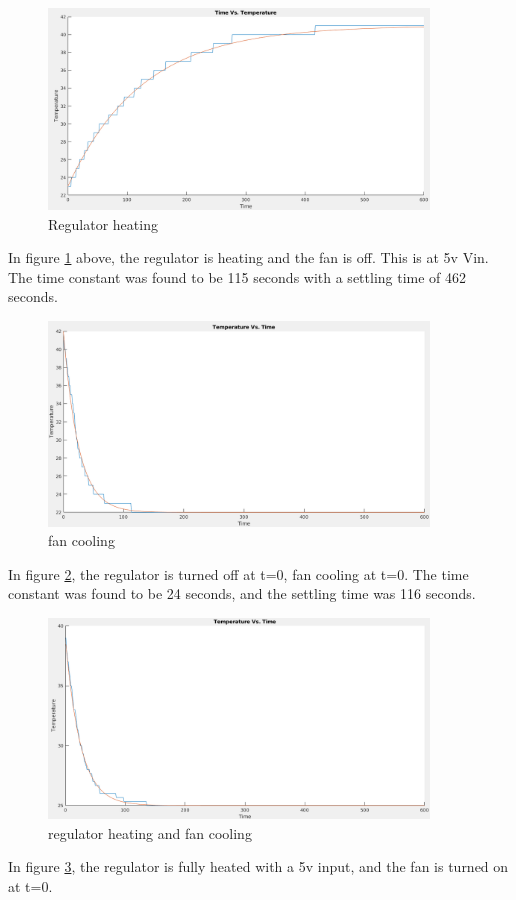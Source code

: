 \documentclass{hitec}
\begin{document}
\begin{figure}[H]
\centering
\includegraphics[width=0.9\textwidth]{Fan_off_R_t=0.png}
\caption{Regulator heating}
\label{fig:heat}
\end{figure}
In figure \ref{fig:heat} above, the regulator is heating and the fan is off. This is at 5v Vin. The time constant was found to be 115 seconds with a settling time of 462 seconds. 
\begin{figure}[H]
\centering
\includegraphics[width=0.9\textwidth]{Fan_t=0_Roff_t=0.png}
\caption{fan cooling}
\label{fig:cool}
\end{figure}
In figure \ref{fig:cool}, the regulator is turned off at t=0, fan cooling at t=0. The time constant was found to be 24 seconds, and the settling time was 116 seconds. 

\begin{figure}[H]
\centering
\includegraphics[width=0.9\textwidth]{Fan_t=0_R=on.png}
\caption{regulator heating and fan cooling}
\label{fig:heatcool}
\end{figure} 
In figure \ref{fig:heatcool}, the regulator is fully heated with a 5v input, and the fan is turned on at t=0. 
\\
\end{document}
